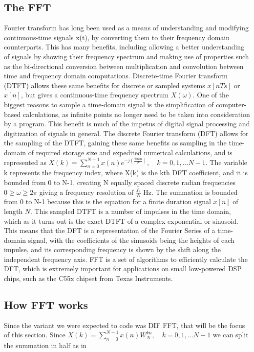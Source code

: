 \documentclass{bannerReport}
\begin{document}
\subsection{The FFT}
Fourier transform has long been used as a means of understanding and modifying continuous-time signals x(t), by converting them to their frequency domain counterparts. This has many benefits, including allowing a better understanding of signals by showing their frequency spectrum and making use of properties such as the bi-directional conversion between multiplication and convolution between time and frequency domain computations. Discrete-time Fourier transform (DTFT) allows these same benefits for discrete or sampled systems $x[nTs]$ or $x[n]$, but gives a continuous-time frequency spectrum $X(\omega)$. One of the biggest reasons to sample a time-domain signal is the simplification of computer-based calculations, as infinite points no longer need to be taken into consideration by a program. This benefit is much of the impetus of digital signal processing and digitization of signals in general. The discrete Fourier transform (DFT) allows for the sampling of the DTFT, gaining these same benefits as sampling in the time-domain of required storage size and expedited numerical calculations, and is represented as $X(k) = \sum^{N-1}_{n = 0}x(n)e^{-j(\frac{2 \pi kn}{N} )}, \quad k = 0, 1,... N-1$. The variable k represents the frequency index, where X(k) is the kth DFT coefficient, and it is bounded from 0 to N-1, creating N equally spaced discrete radian frequencies $0 \geq \omega \geq 2 \pi$ giving a frequency resolution of $\frac{f_s}{N}$ Hz. The summation is bounded from 0 to N-1 because this is the equation for a finite duration signal $x[n]$ of length $N$. This sampled DTFT is a number of impulses in the time domain, which as it turns out is the exact DTFT of a complex exponential or sinusoid. This means that the DFT is a representation of the Fourier Series of a time-domain signal, with the coefficients of the sinusoids being the heights of each impulse, and its corresponding frequency is shown by the shift along the independent frequency axis. FFT is a set of algorithms to efficiently calculate the DFT, which is extremely important for applications on small low-powered DSP chips, such as the C55x chipset from Texas Instruments. 

\subsection{How FFT works}
Since the variant we were expected to code was DIF FFT, that will be the focus of this section. Since  $X(k) = \sum^{N-1}_{n = 0}x(n)W^{kn}_N, \quad k = 0, 1,... N-1$ we can split the summation in half as in 
\end{document}
